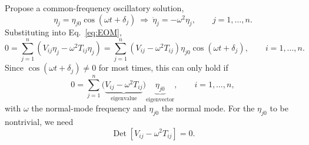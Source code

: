 \documentclass[11pt]{article}
\DeclareMathOperator{\Det}{Det}
\begin{document}
Propose a common-frequency oscillatory solution,
\begin{equation}
\eta_j = \eta_{j0}\cos(\omega t+\delta_j) \ \Longrightarrow\ \ddot\eta_j = -\omega^2\eta_j, \qquad j=1,\dots,n.
\end{equation}
Substituting into Eq.~\eqref{eq:EOM},
\begin{equation}
0 = \sum_{j=1}^{n}\left(V_{ij}\eta_j - \omega^2 T_{ij}\eta_j\right) = \sum_{j=1}^n\left(V_{ij}-\omega^2 T_{ij}\right)\eta_{j0}\cos(\omega t+\delta_j), \qquad i=1,\dots,n.
\end{equation}
Since $\cos(\omega t+\delta_j)\neq0$ for most times, this can only hold if
\begin{equation}
0 = \sum_{j=1}^n \bigl(\underbrace{V_{ij}-\omega^2 T_{ij}}_{\text{eigenvalue}}\bigr)\underbrace{\eta_{j0}}_{\text{eigenvector}}, \qquad i=1,\dots,n,
\label{eq:eigenproblem}
\end{equation}
with $\omega$ the normal-mode frequency and $\eta_{j0}$ the normal mode. For the $\eta_{j0}$ to be nontrivial, we need
\begin{equation}
\boxed{\Det\left[V_{ij}-\omega^2 T_{ij}\right] = 0.}
\label{eq:secular}
\end{equation}
\end{document}
